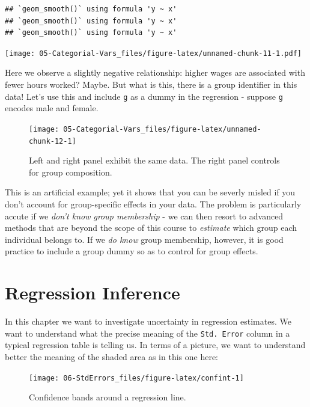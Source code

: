 \documentclass[]{book}
\begin{document}
\begin{verbatim}
## `geom_smooth()` using formula 'y ~ x'
## `geom_smooth()` using formula 'y ~ x'
## `geom_smooth()` using formula 'y ~ x'
\end{verbatim}

\texttt{[image: 05-Categorial-Vars\_files/figure-latex/unnamed-chunk-11-1.pdf]}

Here we observe a slightly negative relationship: higher wages are
associated with fewer hours worked? Maybe. But what is this, there is a
group identifier in this data! Let's use this and include \texttt{g} as
a dummy in the regression - suppose \texttt{g} encodes male and female.

\begin{figure}

{\centering \texttt{[image: 05-Categorial-Vars\_files/figure-latex/unnamed-chunk-12-1]} 

}

\caption{Left and right panel exhibit the same data. The right panel controls for group composition.}\label{fig:unnamed-chunk-12}
\end{figure}

This is an artificial example; yet it shows that you can be severly
misled if you don't account for group-specific effects in your data. The
problem is particularly accute if we \emph{don't know group membership}
- we can then resort to advanced methods that are beyond the scope of
this course to \emph{estimate} which group each individual belongs to.
If we \emph{do know} group membership, however, it is good practice to
include a group dummy so as to control for group effects.

\chapter{Regression Inference}\label{std-errors}

In this chapter we want to investigate uncertainty in regression
estimates. We want to understand what the precise meaning of the
\texttt{Std.\ Error} column in a typical regression table is telling us.
In terms of a picture, we want to understand better the meaning of the
shaded area as in this one here:

\begin{figure}

{\centering \texttt{[image: 06-StdErrors\_files/figure-latex/confint-1]} 

}

\caption{Confidence bands around a regression line.}\label{fig:confint}
\end{figure}
\end{document}
